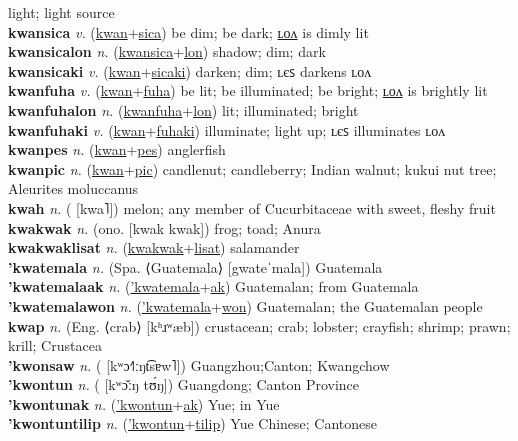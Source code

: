 light; light source \label{kwanmwonilum} \\
\textbf{kwansica} \textit{v.} (\hyperref[kwan]{kwan}+\hyperref[sica]{sica})
be dim; be dark; \hyperref[kwansicalon]{ʟᴏᴧ} is dimly lit \label{kwansica} \\
\textbf{kwansicalon} \textit{n.} (\hyperref[kwansica]{kwansica}+\hyperref[lon]{lon})
shadow; dim; dark \label{kwansicalon} \\
\textbf{kwansicaki} \textit{v.} (\hyperref[kwan]{kwan}+\hyperref[sicaki]{sicaki})
darken; dim; ʟєꜱ darkens ʟᴏᴧ \label{kwansicaki} \\
\textbf{kwanfuha} \textit{v.} (\hyperref[kwan]{kwan}+\hyperref[fuha]{fuha})
be lit; be illuminated; be bright; \hyperref[kwanfuhalon]{ʟᴏᴧ} is brightly lit \label{kwanfuha} \\
\textbf{kwanfuhalon} \textit{n.} (\hyperref[kwanfuha]{kwanfuha}+\hyperref[lon]{lon})
lit; illuminated; bright \label{kwanfuhalon} \\
\textbf{kwanfuhaki} \textit{v.} (\hyperref[kwan]{kwan}+\hyperref[fuhaki]{fuhaki})
illuminate; light up; ʟєꜱ illuminates ʟᴏᴧ \label{kwanfuhaki} \\
\textbf{kwanpes} \textit{n.} (\hyperref[kwan]{kwan}+\hyperref[pes]{pes})
anglerfish \label{kwanpes} \\
\textbf{kwanpic} \textit{n.} (\hyperref[kwan]{kwan}+\hyperref[pic]{pic})
candlenut; candleberry; Indian walnut; kukui nut tree; Aleurites moluccanus \label{kwanpic} \\
\textbf{kwah} \textit{n.} ( [kwa˥])
melon; any member of Cucurbitaceae with sweet, fleshy fruit \label{kwah} \\
\textbf{kwakwak} \textit{n.} (ono. [kwak kwak])
frog; toad; Anura \label{kwakwak} \\
\textbf{kwakwaklisat} \textit{n.} (\hyperref[kwakwak]{kwakwak}+\hyperref[lisat]{lisat})
salamander \label{kwakwaklisat} \\
\textbf{'kwatemala} \textit{n.} (Spa. ⟨Guatemala⟩ [gwateˈmala])
Guatemala \label{'kwatemala} \\
\textbf{'kwatemalaak} \textit{n.} (\hyperref['kwatemala]{'kwatemala}+\hyperref[ak]{ak})
Guatemalan; from Guatemala \label{'kwatemalaak} \\
\textbf{'kwatemalawon} \textit{n.} (\hyperref['kwatemala]{'kwatemala}+\hyperref[won]{won})
Guatemalan; the Guatemalan people \label{'kwatemalawon} \\
\textbf{kwap} \textit{n.} (Eng. ⟨crab⟩ [kʰɹʷæb])
crustacean; crab; lobster; crayfish; shrimp; prawn; krill; Crustacea \label{kwap} \\
\textbf{'kwonsaw} \textit{n.} ( [kʷɔ˧˥ːŋt͡sɐw˥])
Guangzhou;Canton; Kwangchow \label{'kwonsaw} \\
\textbf{'kwontun} \textit{n.} ( [kʷɔ̌ːŋ tʊ́ŋ])
Guangdong; Canton Province \label{'kwontun} \\
\textbf{'kwontunak} \textit{n.} (\hyperref['kwontun]{'kwontun}+\hyperref[ak]{ak})
Yue; in Yue \label{'kwontunak} \\
\textbf{'kwontuntilip} \textit{n.} (\hyperref['kwontun]{'kwontun}+\hyperref[tilip]{tilip})
Yue Chinese; Cantonese \label{'kwontuntilip} 

